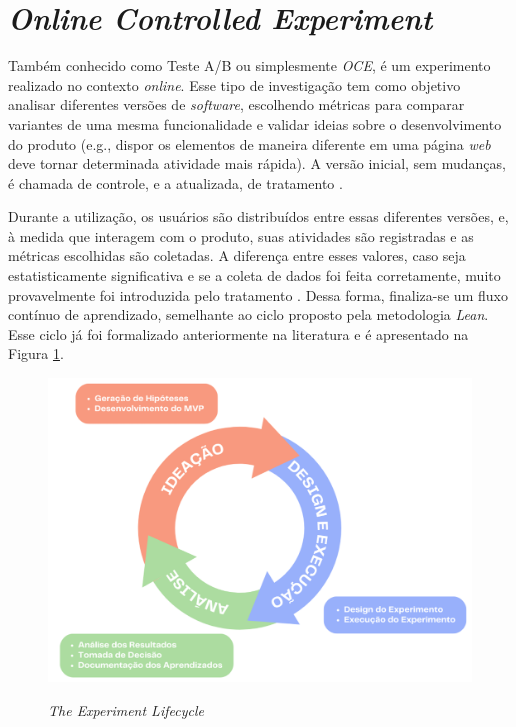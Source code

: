 \section{\textit{Online Controlled Experiment}}

Também conhecido como Teste A/B ou simplesmente \textit{OCE}, é um experimento realizado no contexto \textit{online}. Esse tipo de investigação tem como objetivo analisar diferentes versões de \textit{software}, escolhendo métricas para comparar variantes de uma mesma funcionalidade e validar ideias sobre o desenvolvimento do produto (e.g., dispor os elementos de maneira diferente em uma página \textit{web} deve tornar determinada atividade mais rápida). A versão inicial, sem mudanças, é chamada de controle, e a atualizada, de tratamento \cite{fabijan_online_2020}.

Durante a utilização, os usuários são distribuídos entre essas diferentes versões, e, à medida que interagem com o produto, suas atividades são registradas e as métricas escolhidas são coletadas. A diferença entre esses valores, caso seja estatisticamente significativa e se a coleta de dados foi feita corretamente, muito provavelmente foi introduzida pelo tratamento \cite{kohavi_oce_and_ab_tests_2017}. Dessa forma, finaliza-se um fluxo contínuo de aprendizado, semelhante ao ciclo proposto pela metodologia \textit{Lean}. Esse ciclo já foi formalizado anteriormente na literatura e é apresentado na Figura \ref{fig:oce_lifecycle}.

\begin{figure}
    \centering
    \caption{\textit{The Experiment Lifecycle} }
    \includegraphics[width=0.75\linewidth]{figuras/oce_lifecycle.png}
    \label{fig:oce_lifecycle}
\end{figure}
